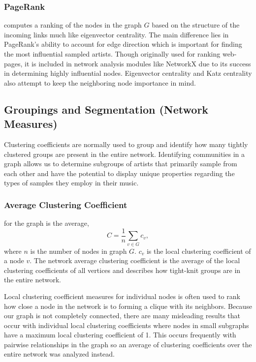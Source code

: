 \documentclass[pageno]{jpaper}
\begin{document}
\subsubsection{PageRank}
computes a ranking of the nodes in the graph $G$ based on the structure of the incoming links much like eigenvector centrality. The main difference lies in PageRank's ability to account for edge direction which is important for finding the most influential sampled artists. Though originally used for ranking web-pages, it is included in network analysis modules like NetworkX due to its success in determining highly influential nodes. Eigenvector centrality and Katz centrality also attempt to keep the neighboring node importance in mind.
\subsection{Groupings and Segmentation (Network Measures)}
Clustering coefficients are normally used to group and identify how many tightly clustered groups are present in the entire network. Identifying communities in a graph allows us to determine subgroups of artists that primarily sample from each other and have the potential to display unique properties regarding the types of samples they employ in their music.
\subsubsection{Average Clustering Coefficient}
for the graph is the average, 
\begin{equation}
C = \frac{1}{n}\sum_{v \in G} c_v,
\end{equation} where $n$ is the number of nodes in graph $G$.  $c_v$ is the local clustering coefficient of a node $v$. The network average clustering coefficient is the average of the local clustering coefficients of all vertices and describes how tight-knit groups are in the entire network.

Local clustering coefficient measures for individual nodes is often used to rank how close a node in the network is to forming a clique with its neighbors. Because our graph is not completely connected, there are many misleading results that occur with individual local clustering coefficients where nodes in small subgraphs have a maximum local clustering coefficient of 1. This occurs frequently with pairwise relationships in the graph so an average of clustering coefficients over the entire network was analyzed instead.
\end{document}
